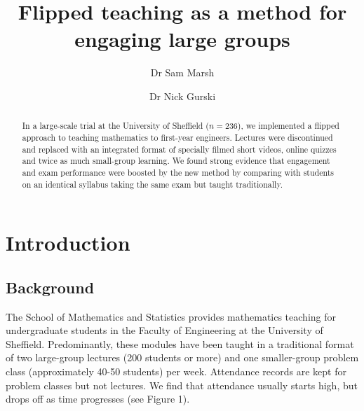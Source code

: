 \documentclass{amsart}
\title{Flipped teaching as a method for engaging large groups}
\author{Dr Sam Marsh}
\author{Dr Nick Gurski}
\begin{document}
\maketitle

\begin{abstract}
In a large-scale trial at the University of Sheffield ($n=236$), we implemented a flipped approach to teaching mathematics to first-year engineers. Lectures were discontinued and replaced with an integrated format of specially filmed short videos, online quizzes and twice as much small-group learning.  We found strong evidence that engagement and exam performance were boosted by the new method by comparing with students on an identical syllabus taking the same exam but taught traditionally.
\end{abstract}

\section{Introduction}

\subsection{Background}

The School of Mathematics and Statistics provides mathematics teaching for undergraduate students in the Faculty of Engineering at the University of Sheffield. Predominantly, these modules have been taught in a traditional format of two large-group lectures (200 students or more) and one smaller-group problem class (approximately 40-50 students) per week.  Attendance records are kept for problem classes but not lectures.  We find that attendance usually starts high, but drops off as time progresses (see Figure 1).
\end{document}
